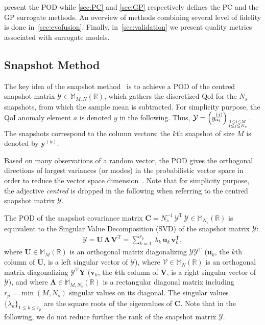  present the POD while \cref{sec:PC} and \cref{sec:GP} respectively defines the PC and the GP surrogate methods. An overview of methods combining several level of fidelity is done in~\cref{sec:evofusion}. Finally, in~\cref{sec:validation} we present quality metrics associated with surrogate models.

\subsection{Snapshot Method}\label{sec:POD}

The key idea of the snapshot method~\citep{sirovich1987} is to achieve a POD of the centred snapshot matrix $\mathcal{Y} \in \mathbb{M}_{M,N}(\mathbb{R})$, which gathers the discretized QoI for the $N_{s}$ snapshots, from which the sample mean is subtracted. For simplicity purpose, the QoI anomaly element $a$ is denoted $y$ in the following. Thus, $\mathcal{Y} = \left(y_{a_i}^{(j)}\right)_{1\leq i \leq M \atop 1\leq j \leq N_{s}}$. The snapshots correspond to the column vectors; the $k$th snapshot of size $M$ is denoted by $\mathbf{y}^{(k)}$.

Based on many observations of a random vector, the POD gives the orthogonal directions of largest variances (or modes) in the probabilistic vector space in order to reduce the vector space dimension~\citep{chatterjee2000}. Note that for simplicity purpose, the adjective {\it centred} is dropped in the following when referring to the centred snapshot matrix $\mathcal{Y}$.

The POD of the snapshot covariance matrix $\mathbf{C} = N_{s}^{-1}\,\mathcal{Y}^{\mathrm{T}}\,\mathcal{Y}\in \mathbb{M}_{N_{s}}(\mathbb{R})$ is equivalent to the Singular Value Decomposition (SVD) of the snapshot matrix $\mathcal{Y}$:
\begin{align}
\mathcal{Y} = \mathbf{U}\,\mathbf{\Lambda}\,\mathbf{V}^{\mathrm{T}} = \displaystyle\sum_{k = 1}^{r_{p}}\,\lambda_k\,\mathbf{u}_k\,\mathbf{v}_k^{\mathrm{T}},
\end{align} 
where $\mathbf{U} \in \mathbb{M}_M(\mathbb{R})$ is an orthogonal matrix diagonalizing $\mathcal{Y}\mathcal{Y}^{\mathrm{T}}$ ($\mathbf{u}_k$, the $k$th column of $\mathbf{U}$, is a left singular vector of $\mathcal{Y}$), where $\mathcal{V} \in \mathbb{M}_N(\mathbb{R})$ is an orthogonal matrix diagonalizing $\mathcal{Y}^{\mathrm{T}}\mathbf{Y}$ ($\mathbf{v}_k$, the $k$th column of $\mathbf{V}$, is a right singular vector of $\mathcal{Y}$), and where $\mathbf{\Lambda} \in \mathbb{M}_{M,N_{s}}(\mathbb{R})$ is a rectangular diagonal matrix including $r_{p}=\min(M,N_{s})$ singular values on its diagonal. The singular values $\lbrace \lambda_k \rbrace_{1 \leq k \leq r_{p}}$ are the square roots of the eigenvalues of $\mathbf{C}$. 
Note that in the following, we do not reduce further the rank of the snapshot matrix $\mathcal{Y}$. 

